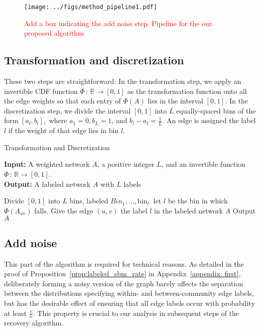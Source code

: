 \documentclass{article}
\newcommand{\bin}{\text{bin}}
\begin{document}
\begin{figure}[htp]
\centering
\texttt{[image: ../figs/method\_pipeline1.pdf]}
\caption{\textcolor{red}{Add a box indicating the add noise step. Pipeline for the our proposed algorithm}}
\label{fig:method_pipeline1}
\end{figure}

\subsection{Transformation and discretization}

These two steps are straightforward: In the transformation step, we apply an invertible CDF function $\Phi \,:\, \mathbb{R} \rightarrow [0,1]$ as the transformation function onto all the edge weights so that each entry of $\Phi(A)$ lies in the interval $[0,1]$. In the discretization step, we divide the interval $[0,1]$ into $L$ equally-spaced bins of the form $[a_l, b_l],$ where $a_1 = 0, b_L = 1$, and $b_l - a_l = \frac{1}{L}$. An edge is assigned the label $l$ if the weight of that edge lies in bin $l$. 

\begin{algorithm}
\caption{Transformation and Discretization}
\label{alg:transform_and_discretize}
\textbf{Input:} A weighted network $A$, a positive integer $L$, and an invertible function $\Phi \,:\, \mathbb{R} \rightarrow [0,1]$.\\
\textbf{Output:} A labeled network $A$ with $L$ labels\\

\begin{algorithmic}
\State Divide $[0,1]$ into $L$ bins, labeled $Bin_1, \dots, \bin_l$.
   \State let $l$ be the bin in which $\Phi(A_{uv})$ falls.
   \State Give the edge $(u,v)$ the label $l$ in the labeled network $A$
\EndFor
\State Output $A$
\end{algorithmic}
\end{algorithm}

\subsection{Add noise}

This part of the algorithm is required for technical reasons. As detailed in the proof of Proposition~\ref{prop:labeled_sbm_rate} in Appendix~\ref{appendix: first}, deliberately forming a noisy version of the graph barely affects the separation between the distributions specifying within- and between-community edge labels, but has the desirable effect of ensuring that all edge labels occur with probability at least $\frac{c}{n}$. This property is crucial to our analysis in subsequent steps of the recovery algorithm.
\end{document}
